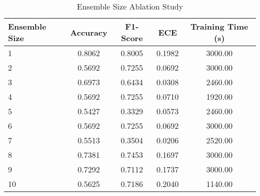 \begin{table}[htbp]
\centering
\caption{Ensemble Size Ablation Study}
\label{tab:ensemble_size_ablation}
\begin{tabular}{l|cccc}
\hline
\textbf{Ensemble Size} & \textbf{Accuracy} & \textbf{F1-Score} & \textbf{ECE} & \textbf{Training Time (s)} \\
\hline
1 & 0.8062 & 0.8005 & 0.1982 & 3000.00 \\
2 & 0.5692 & 0.7255 & 0.0692 & 3000.00 \\
3 & 0.6973 & 0.6434 & 0.0308 & 2460.00 \\
4 & 0.5692 & 0.7255 & 0.0710 & 1920.00 \\
5 & 0.5427 & 0.3329 & 0.0573 & 2460.00 \\
6 & 0.5692 & 0.7255 & 0.0692 & 3000.00 \\
7 & 0.5513 & 0.3504 & 0.0206 & 2520.00 \\
8 & 0.7381 & 0.7453 & 0.1697 & 3000.00 \\
9 & 0.7292 & 0.7112 & 0.1737 & 3000.00 \\
10 & 0.5625 & 0.7186 & 0.2040 & 1140.00 \\
\hline
\end{tabular}
\end{table}